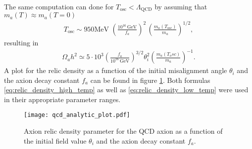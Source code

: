 \documentclass[twoside,a4paper, 12pt]{article}
\numberwithin{equation}{section}
\begin{document}
The same computation can done for $T_\mathrm{osc} < \Lambda_\mathrm{QCD}$ by assuming that $m_a(T) \approx m_a(T = 0)$ \cite[Sec. 2.1]{Fox:2004kb}
\begin{align*}
    T_\mathrm{osc} \sim 950 \mathrm{MeV} \, \, \left(\frac{10^{16} \, \mathrm{GeV}}{f_a} \right)^2 \, \left(\frac{m_a(T_\mathrm{osc})}{m_a} \right)^{1/2},
\end{align*}
resulting in
\begin{align}
    \label{eq:relic_density_low_temp}
    \Omega_a h^2 \simeq 5 \cdot 10^3 \left( \frac{f_a}{10^{16} \, \mathrm{GeV}} \right)^{3/2} \theta_i^2 \left( \frac{m_a(T_osc)}{m_a} \right)^{-1}.
\end{align}
A plot for the relic density as a function of the initial misalignment angle $\theta_i$
and the axion decay constant $f_a$ can be found in figure \ref{fig:qcd_wkb_plot}.
Both formulas \eqref{eq:relic_density_high_temp} as well as
\eqref{eq:relic_density_low_temp} were used in their appropriate parameter ranges.
\begin{figure}[H]
    \centering
    \texttt{[image: qcd\_analytic\_plot.pdf]}
    \caption{Axion relic density parameter for the QCD axion
     as a function of the initial field value $\theta_i$ and the axion decay constant $f_a$.
   }
    \label{fig:qcd_wkb_plot}
\end{figure}
\end{document}
